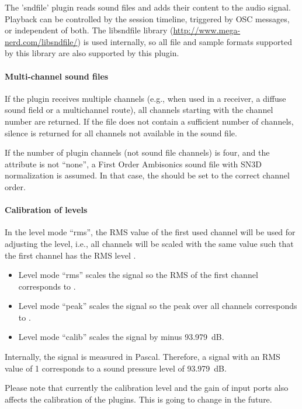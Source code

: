 The 'sndfile' plugin reads sound files and adds their content to the audio signal. Playback can be controlled by the session timeline, triggered by OSC messages, or independent of both. The libsndfile library (\url{http://www.mega-nerd.com/libsndfile/}) is used internally, so all file and sample formats supported by this library are also supported by this plugin.



\paragraph{Multi-channel sound files}
%
If the plugin receives multiple channels (e.g., when used in a receiver, a diffuse sound field or a multichannel route), all channels starting with the channel number  are returned. If the file does not contain a sufficient number of channels, silence is returned for all channels not available in the sound file.

If the number of plugin channels (not sound file channels) is four, and the attribute  is not ``none'', a First Order Ambisonics sound file with SN3D normalization is assumed. In that case, the  should be set to the correct channel order.

\paragraph{Calibration of levels}
%
In the level mode ``rms'', the RMS value of the first used channel
will be used for adjusting the level, i.e., all channels will be
scaled with the same value such that the first channel has the
RMS level .
\begin{itemize}
\item Level mode ``rms'' scales the signal so the RMS of the first channel corresponds to .

\item Level mode ``peak'' scales the signal so the peak over all channels corresponds to .

\item Level mode ``calib'' scales the signal by  minus 93.979~dB.
\end{itemize}
Internally, the signal is measured in Pascal. Therefore, a signal with an RMS value of 1 corresponds to a sound pressure level of 93.979~dB.

Please note that currently the calibration level and the gain of input ports also affects the calibration of the plugins. This is going to change in the future.


